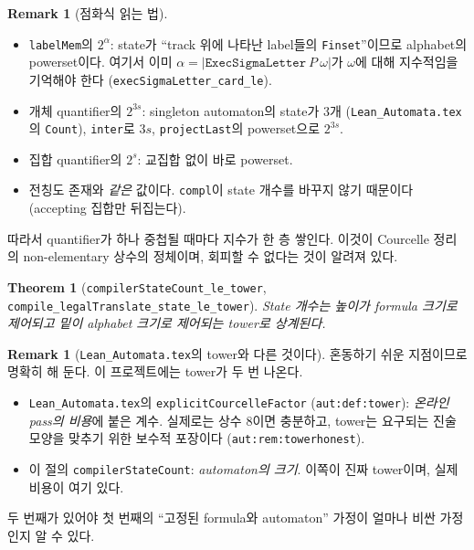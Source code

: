 \documentclass[11pt]{article}
\theoremstyle{definition}
\newtheorem{remark}[definition]{Remark}
\theoremstyle{plain}
\newtheorem{theorem}[definition]{Theorem}
\newcommand{\lean}[1]{\texttt{#1}}
\newcommand{\leanfile}[1]{\texttt{#1}}
\begin{document}
\begin{remark}[점화식 읽는 법]
\label{alg:rem:readingrecurrence}
\begin{itemize}
  \item \lean{labelMem}의 $2^\alpha$: state가 ``track 위에 나타난 label들의
    \lean{Finset}''이므로 alphabet의 powerset이다. 여기서 이미
    $\alpha = |\lean{ExecSigmaLetter}\ P\ \omega|$가 $\omega$에 대해
    지수적임을 기억해야 한다 (\lean{execSigmaLetter\_card\_le}).
  \item 개체 quantifier의 $2^{3s}$: singleton automaton의 state가 3개
    (\leanfile{Lean\_Automata.tex}의 \lean{Count}), \lean{inter}로 $3s$,
    \lean{projectLast}의 powerset으로 $2^{3s}$.
  \item 집합 quantifier의 $2^s$: 교집합 없이 바로 powerset.
  \item 전칭도 존재와 \emph{같은} 값이다. \lean{compl}이 state 개수를 바꾸지
    않기 때문이다 (accepting 집합만 뒤집는다).
\end{itemize}
따라서 quantifier가 하나 중첩될 때마다 지수가 한 층 쌓인다. 이것이 Courcelle
정리의 non-elementary 상수의 정체이며, 회피할 수 없다는 것이 알려져 있다.
\end{remark}

\begin{theorem}[\lean{compilerStateCount\_le\_tower},
\lean{compile\_legalTranslate\_state\_le\_tower}]
\label{alg:thm:towerbound}
State 개수는 높이가 formula 크기로 제어되고 밑이 alphabet 크기로 제어되는
tower로 상계된다.
\end{theorem}

\begin{remark}[\leanfile{Lean\_Automata.tex}의 tower와 다른 것이다]
\label{alg:rem:twotowers}
혼동하기 쉬운 지점이므로 명확히 해 둔다. 이 프로젝트에는 tower가 두 번
나온다.
\begin{itemize}
  \item \leanfile{Lean\_Automata.tex}의 \lean{explicitCourcelleFactor}
    (\lean{aut:def:tower}): \emph{온라인 pass의 비용}에 붙은 계수. 실제로는
    상수 8이면 충분하고, tower는 요구되는 진술 모양을 맞추기 위한 보수적
    포장이다 (\lean{aut:rem:towerhonest}).
  \item 이 절의 \lean{compilerStateCount}: \emph{automaton의 크기}. 이쪽이
    진짜 tower이며, 실제 비용이 여기 있다.
\end{itemize}
두 번째가 있어야 첫 번째의 ``고정된 formula와 automaton'' 가정이 얼마나 비싼
가정인지 알 수 있다.
\end{remark}
\end{document}
